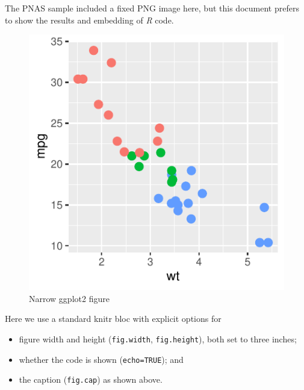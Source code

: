 \documentclass[letterpaper,9pt,twocolumn,twoside,]{pinp}
\providecommand{\tightlist}{%
  \setlength{\itemsep}{0pt}\setlength{\parskip}{0pt}}
\begin{document}
The PNAS sample included a fixed PNG image here, but this document
prefers to show the results and embedding of \emph{R} code.

\begin{Shaded}
\begin{Highlighting}[]
\SpecialCharTok{+}
    \NormalTok{(}\NormalTok{, }\NormalTok{(}\SpecialCharTok{+}
    \NormalTok{(}\NormalTok{)}
\end{Highlighting}
\end{Shaded}

\begin{figure}

{\centering \includegraphics{DATA3888_Final_report_files/figure-latex/figex-1} 

}

\caption{Narrow ggplot2 figure}\label{fig:figex}
\end{figure}

Here we use a standard knitr bloc with explicit options for

\begin{itemize}
\tightlist
\item
  figure width and height (\texttt{fig.width}, \texttt{fig.height}),
  both set to three inches;
\item
  whether the code is shown (\texttt{echo=TRUE}); and
\item
  the caption (\texttt{fig.cap}) as shown above.
\end{itemize}
\end{document}
